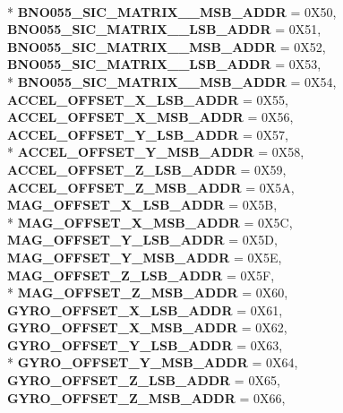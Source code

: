 \begin{DoxyCompactItemize}
\\*
{\bfseries B\-N\-O055\-\_\-\-S\-I\-C\-\_\-\-M\-A\-T\-R\-I\-X\-\_\-\_\-\-M\-S\-B\-\_\-\-A\-D\-D\-R} = 0\-X50, 
{\bfseries B\-N\-O055\-\_\-\-S\-I\-C\-\_\-\-M\-A\-T\-R\-I\-X\-\_\-\_\-\-L\-S\-B\-\_\-\-A\-D\-D\-R} = 0\-X51, 
{\bfseries B\-N\-O055\-\_\-\-S\-I\-C\-\_\-\-M\-A\-T\-R\-I\-X\-\_\-\_\-\-M\-S\-B\-\_\-\-A\-D\-D\-R} = 0\-X52, 
{\bfseries B\-N\-O055\-\_\-\-S\-I\-C\-\_\-\-M\-A\-T\-R\-I\-X\-\_\-\_\-\-L\-S\-B\-\_\-\-A\-D\-D\-R} = 0\-X53, 
\\*
{\bfseries B\-N\-O055\-\_\-\-S\-I\-C\-\_\-\-M\-A\-T\-R\-I\-X\-\_\-\_\-\-M\-S\-B\-\_\-\-A\-D\-D\-R} = 0\-X54, 
{\bfseries A\-C\-C\-E\-L\-\_\-\-O\-F\-F\-S\-E\-T\-\_\-\-X\-\_\-\-L\-S\-B\-\_\-\-A\-D\-D\-R} = 0\-X55, 
{\bfseries A\-C\-C\-E\-L\-\_\-\-O\-F\-F\-S\-E\-T\-\_\-\-X\-\_\-\-M\-S\-B\-\_\-\-A\-D\-D\-R} = 0\-X56, 
{\bfseries A\-C\-C\-E\-L\-\_\-\-O\-F\-F\-S\-E\-T\-\_\-\-Y\-\_\-\-L\-S\-B\-\_\-\-A\-D\-D\-R} = 0\-X57, 
\\*
{\bfseries A\-C\-C\-E\-L\-\_\-\-O\-F\-F\-S\-E\-T\-\_\-\-Y\-\_\-\-M\-S\-B\-\_\-\-A\-D\-D\-R} = 0\-X58, 
{\bfseries A\-C\-C\-E\-L\-\_\-\-O\-F\-F\-S\-E\-T\-\_\-\-Z\-\_\-\-L\-S\-B\-\_\-\-A\-D\-D\-R} = 0\-X59, 
{\bfseries A\-C\-C\-E\-L\-\_\-\-O\-F\-F\-S\-E\-T\-\_\-\-Z\-\_\-\-M\-S\-B\-\_\-\-A\-D\-D\-R} = 0\-X5\-A, 
{\bfseries M\-A\-G\-\_\-\-O\-F\-F\-S\-E\-T\-\_\-\-X\-\_\-\-L\-S\-B\-\_\-\-A\-D\-D\-R} = 0\-X5\-B, 
\\*
{\bfseries M\-A\-G\-\_\-\-O\-F\-F\-S\-E\-T\-\_\-\-X\-\_\-\-M\-S\-B\-\_\-\-A\-D\-D\-R} = 0\-X5\-C, 
{\bfseries M\-A\-G\-\_\-\-O\-F\-F\-S\-E\-T\-\_\-\-Y\-\_\-\-L\-S\-B\-\_\-\-A\-D\-D\-R} = 0\-X5\-D, 
{\bfseries M\-A\-G\-\_\-\-O\-F\-F\-S\-E\-T\-\_\-\-Y\-\_\-\-M\-S\-B\-\_\-\-A\-D\-D\-R} = 0\-X5\-E, 
{\bfseries M\-A\-G\-\_\-\-O\-F\-F\-S\-E\-T\-\_\-\-Z\-\_\-\-L\-S\-B\-\_\-\-A\-D\-D\-R} = 0\-X5\-F, 
\\*
{\bfseries M\-A\-G\-\_\-\-O\-F\-F\-S\-E\-T\-\_\-\-Z\-\_\-\-M\-S\-B\-\_\-\-A\-D\-D\-R} = 0\-X60, 
{\bfseries G\-Y\-R\-O\-\_\-\-O\-F\-F\-S\-E\-T\-\_\-\-X\-\_\-\-L\-S\-B\-\_\-\-A\-D\-D\-R} = 0\-X61, 
{\bfseries G\-Y\-R\-O\-\_\-\-O\-F\-F\-S\-E\-T\-\_\-\-X\-\_\-\-M\-S\-B\-\_\-\-A\-D\-D\-R} = 0\-X62, 
{\bfseries G\-Y\-R\-O\-\_\-\-O\-F\-F\-S\-E\-T\-\_\-\-Y\-\_\-\-L\-S\-B\-\_\-\-A\-D\-D\-R} = 0\-X63, 
\\*
{\bfseries G\-Y\-R\-O\-\_\-\-O\-F\-F\-S\-E\-T\-\_\-\-Y\-\_\-\-M\-S\-B\-\_\-\-A\-D\-D\-R} = 0\-X64, 
{\bfseries G\-Y\-R\-O\-\_\-\-O\-F\-F\-S\-E\-T\-\_\-\-Z\-\_\-\-L\-S\-B\-\_\-\-A\-D\-D\-R} = 0\-X65, 
{\bfseries G\-Y\-R\-O\-\_\-\-O\-F\-F\-S\-E\-T\-\_\-\-Z\-\_\-\-M\-S\-B\-\_\-\-A\-D\-D\-R} = 0\-X66, 

\end{DoxyCompactItemize}
